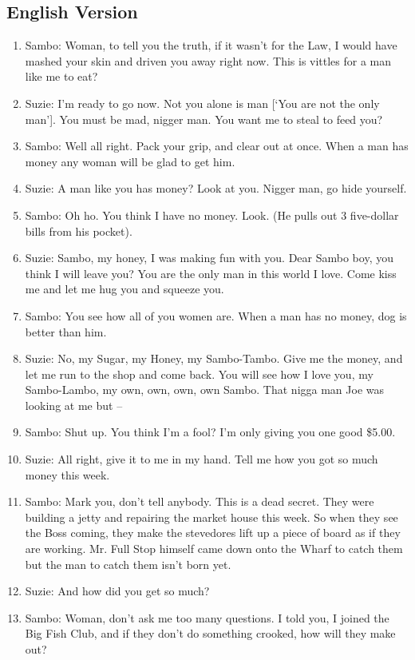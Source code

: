 \documentclass[output=paper,colorlinks,citecolor=brown]{langscibook}
\begin{document}
\subsection*{English Version}
\begin{enumerate}[nosep]
    \item Sambo:  Woman, to tell you the truth, if it wasn’t for the Law, I would have mashed your skin and driven you away right now.  This is vittles for a man like me to eat?  
    \item Suzie:	I’m ready to go now.  Not you alone is man [‘You are not the only man’].  You must be mad, nigger man.  You want me to steal to feed you?
    \item Sambo:  Well all right. Pack your grip, and clear out at once. When a man has money any woman will be glad to get him. 
    \item Suzie:	A man like you has money? Look at you.  Nigger man, go hide yourself.
    \item Sambo:  Oh ho. You think I have no money.  Look.  (He pulls out 3 five-dollar bills from his pocket).
    \item Suzie:	Sambo, my honey, I was making fun with you.  Dear Sambo boy, you think I will leave you?  You are the only man in this world I love.  Come kiss me and let me hug you and squeeze you.  
    \item Sambo:  You see how all of you women are. When a man has no money, dog is better than him. 
    \item Suzie:	No, my Sugar, my Honey, my Sambo-Tambo.  Give me the money, and let me run to the shop and come back. You will see how I love you, my Sambo-Lambo, my own, own, own, own Sambo.  That nigga man Joe was looking at me but –
    \item Sambo:  Shut up. You think I’m a fool?  I’m only giving you one good \$5.00.
    \item  Suzie:	All right, give it to me in my hand. Tell me how you got so much money this week.
    \item  Sambo:  Mark you, don’t tell anybody. This is a dead secret. They were building a jetty and repairing the market house this week.  So when they see the Boss coming, they make the stevedores lift up a piece of board as if they are working.  Mr. Full Stop himself came down onto the Wharf to catch them but the man to catch them isn’t born yet.
    \item  Suzie:	And how did you get so much?
    \item  Sambo:  Woman, don’t ask me too many questions.  I told you, I joined the Big Fish Club, and if they don’t do something crooked, how will they make out?

\end{enumerate}
\end{document}
